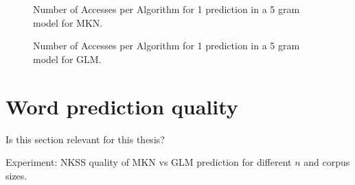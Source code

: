 \clearpage
\thispagestyle{empty}
\begin{figure}[p]
  \centering
  \vspace*{\fill}

  \begin{minipage}{.45\textwidth}
    
    \caption{Number of Accesses per Algorithm for 1 prediction in a 5 gram model for MKN.}
  \end{minipage}
  \hspace{.02\textwidth}
  \begin{minipage}{.45\textwidth}
    
    \caption{Number of Accesses per Algorithm for 1 prediction in a 5 gram model for GLM.}
  \end{minipage}

  \vspace*{\fill}
\end{figure}
\restoregeometry
\clearpage


\section{Word prediction quality}

\begin{draft}
Is this section relevant for this thesis?

Experiment: NKSS quality of MKN vs GLM prediction for different $n$ and corpus
sizes.
\end{draft}
